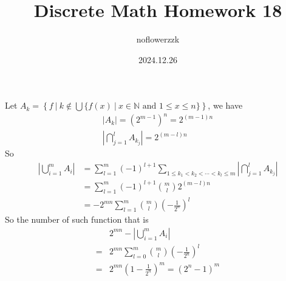 \documentclass{article}
\title{Discrete Math Homework 18}
\author{noflowerzzk}
\date{2024.12.26}
\begin{document}
\maketitle

\section{}

Let $A_k = \left\{f\ \bigg|\ k \notin \bigcup\{f(x)\ |\ x \in \mathbb{N} \text{ and }1 \leqslant x \leqslant n\}\right\}$, we have
\begin{align*}
    \left\lvert A_k\right\rvert = \left(2^{m - 1}\right)^n = 2^{(m - 1)n} \\
    \left\lvert \bigcap_{j = 1}^{l}A_{k_j}\right\rvert = 2^{(m - l)n}  
\end{align*}
So
\begin{align*}
    \left\lvert \bigcup_{i = 1}^{m}A_i\right\rvert &= \sum_{l = 1}^{m}(-1)^{l + 1}\sum_{1 \leqslant k_1 < k_2 < \cdots < k_l \leqslant m}\left\lvert \bigcap_{j = 1}^{l}A_{k_j}\right\rvert \\
    &= \sum_{l = 1}^{m}(-1)^{l + 1}\binom{m}{l} 2^{(m - l)n} \\
    &= -2^{mn}\sum_{l = 1}^{m}\binom{m}{l}\left(-\frac{1}{2^n}\right)^l
\end{align*}
So the number of such function that is
\begin{align*}
    & 2^{mn} - \left\lvert \bigcup_{i = 1}^{m}A_i\right\rvert \\
    =& 2^{mn}\sum_{l = 0}^{m}\binom{m}{l}\left(-\frac{1}{2^n}\right)^l \\
    =& 2^{mn}\left(1 - \frac{1}{2^n}\right)^m = \left(2^n - 1\right)^m
\end{align*}

\section{}
\end{document}
